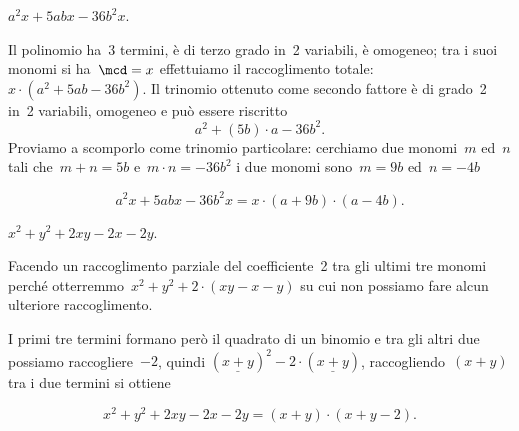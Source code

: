 % 
% 
% 
% 
% 
% 

 \begin{esempio}
 $a^{2}x+5abx-36b^{2}x$.

Il polinomio ha~3 termini, è di terzo grado in~2 variabili, è omogeneo;
tra i suoi monomi si ha~$\mcd= x$ effettuiamo il raccoglimento
totale:~$x\cdot\left(a^{2}+5ab-36b^{2}\right)$.
Il trinomio ottenuto come secondo fattore è di grado~2 in~2 variabili,
omogeneo e può essere riscritto
\[a^{2}+\left(5b\right)\cdot a-36b^{2}.\]
Proviamo a scomporlo come trinomio particolare:
cerchiamo due monomi~$m$ ed~$n$ tali che~$m+n=5b$
e~$m\cdot n=-36b^{2}$ i due monomi sono~$m=9b$
ed~$n=-4b$

\[a^{2}x+5abx-36b^{2}x=x\cdot\left(a+9b\right)\cdot \left(a-4b\right).\]
 \end{esempio}

 \begin{esempio}
 $x^{2}+y^{2}+2xy-2x-2y$.

Facendo un raccoglimento parziale del coefficiente~2 tra gli ultimi tre monomi 
perché otterremmo~$x^{2}+y^{2}+2\cdot\left(xy-x-y\right)$ su cui non possiamo
fare alcun ulteriore raccoglimento.

I primi tre termini formano però il quadrato di un binomio e tra gli
altri due possiamo raccogliere~$-2$, quindi
$\left(\underline{{x+y}}\right)^{2}-2\cdot\left(\underline{{x+y}}\right)$,
raccogliendo~$(x + y)$ tra i due termini si ottiene

\begin{equation*}
x^{2}+y^{2}+2xy-2x-2y=\left(x+y\right)\cdot \left(x+y-2\right).
\end{equation*}
 \end{esempio}

